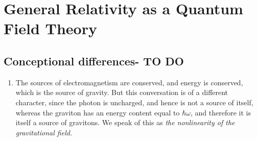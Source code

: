 	\chapter{General Relativity as a Quantum Field Theory}
	\section{Conceptional differences- TO DO}
	\begin{enumerate}
		\item The sources of electromagnetism are conserved, and energy is conserved, which is the source of gravity. But this conversation is of a different character, since the photon is uncharged, and hence is not a source of itself, whereas the graviton has an energy content equal to $\hbar \omega$, and therefore it is itself a source of gravitons. We speak of this as \emph{the nonlinearity of the gravitational field.}
		
	\end{enumerate}
